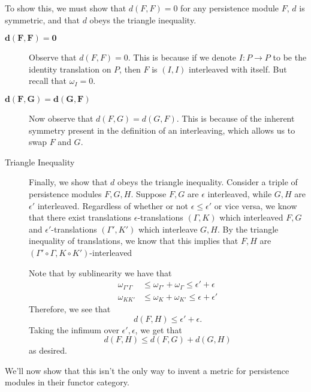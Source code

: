 \begin{prf}
    To show this, we must show that $d(F, F) = 0$ for any persistence 
    module $F$, $d$ is symmetric, and that $d$ obeys the triangle inequality. 
    \begin{description}
        \item[$\bm{d(F, F) = 0}$]
        Observe that $d(F, F) = 0$. This is because if we denote $I: P \to P$ to be the identity
        translation on $P$, then 
        $F$ is $(I, I)$ interleaved with itself. But recall that $\omega_I = 0$. 
        
        \item[$\bm{d(F, G) = d(G,F)}$]
        Now observe that $d(F, G) = d(G, F)$. This is because of the inherent
        symmetry present in the definition of an interleaving, which allows us to 
        swap $F$ and $G$. 
    
        \item[Triangle Inequality]
        Finally, we show that $d$ obeys the triangle inequality. Consider a triple of 
        persistence modules $F, G, H$. Suppose $F, G$ are $\epsilon$ interleaved, 
        while $G, H$ are $\epsilon'$ interleaved. Regardless of whether or not 
        $\epsilon \le \epsilon'$ or vice versa, we know that there exist translations 
        $\epsilon$-translations $(\Gamma, K)$ which interleaved $F, G$ and $\epsilon'$-translations 
        $(\Gamma', K')$ which interleave $G,H$. By the triangle inequality of translations, 
        we know that this implies that $F, H$ are $(\Gamma'\circ \Gamma, K \circ K')$-interleaved 
        
        Note that by sublinearity we have that 
        \begin{align*}
            \omega_{\Gamma'\Gamma} &\le \omega_{\Gamma'} + \omega_{\Gamma} \le \epsilon' + \epsilon\\
            \omega_{KK'} &\le \omega_{K} + \omega_{K'} \le \epsilon + \epsilon'
        \end{align*}
        Therefore, we see that 
        \[
            d(F, H) \le \epsilon' + \epsilon.
        \]
        Taking the infimum over $\epsilon', \epsilon$, we get that 
        \[
            d(F,H) \le d(F,G) + d(G, H)
        \]
        as desired.
    \end{description}
\end{prf}

We'll now show that this isn't the only way to invent a metric for persistence modules 
in their functor category.

